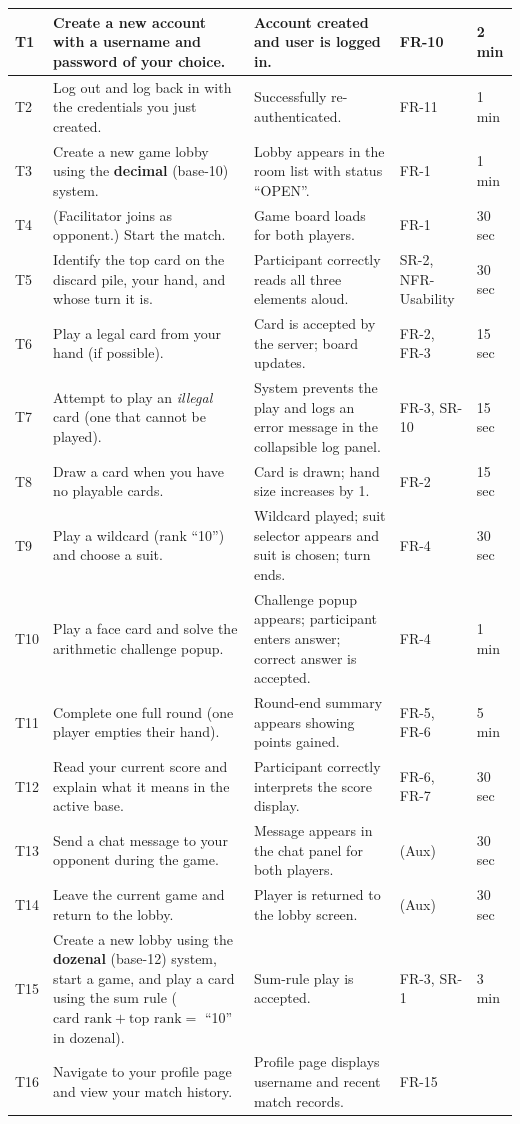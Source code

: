 \documentclass[12pt, titlepage]{article}
\begin{document}
\begin{longtable}{p{0.5cm} p{4.5cm} p{4cm} p{2.5cm} p{2.5cm}}
T1 & Create a new account with a username and password of your choice. & Account created and user is logged in. & FR-10 & 2 min \\
\midrule
T2 & Log out and log back in with the credentials you just created. & Successfully re-authenticated. & FR-11 & 1 min \\
\midrule
T3 & Create a new game lobby using the \textbf{decimal} (base-10) system. & Lobby appears in the room list with status ``OPEN''. & FR-1 & 1 min \\
\midrule
T4 & (Facilitator joins as opponent.) Start the match. & Game board loads for both players. & FR-1 & 30 sec \\
\midrule
T5 & Identify the top card on the discard pile, your hand, and whose turn it is. & Participant correctly reads all three elements aloud. & SR-2, NFR-Usability & 30 sec \\
\midrule
T6 & Play a legal card from your hand (if possible). & Card is accepted by the server; board updates. & FR-2, FR-3 & 15 sec \\
\midrule
T7 & Attempt to play an \emph{illegal} card (one that cannot be played). & System prevents the play and logs an error message in the collapsible log panel. & FR-3, SR-10 & 15 sec \\
\midrule
T8 & Draw a card when you have no playable cards. & Card is drawn; hand size increases by 1. & FR-2 & 15 sec \\
\midrule
T9 & Play a wildcard (rank ``10'') and choose a suit. & Wildcard played; suit selector appears and suit is chosen; turn ends. & FR-4 & 30 sec \\
\midrule
T10 & Play a face card and solve the arithmetic challenge popup. & Challenge popup appears; participant enters answer; correct answer is accepted. & FR-4 & 1 min \\
\midrule
T11 & Complete one full round (one player empties their hand). & Round-end summary appears showing points gained. & FR-5, FR-6 & 5 min \\
\midrule
T12 & Read your current score and explain what it means in the active base. & Participant correctly interprets the score display. & FR-6, FR-7 & 30 sec \\
\midrule
T13 & Send a chat message to your opponent during the game. & Message appears in the chat panel for both players. & (Aux) & 30 sec \\
\midrule
T14 & Leave the current game and return to the lobby. & Player is returned to the lobby screen. & (Aux) & 30 sec \\
\midrule
T15 & Create a new lobby using the \textbf{dozenal} (base-12) system, start a game, and play a card using the sum rule ($\text{card rank} + \text{top rank} = $ ``10'' in dozenal). & Sum-rule play is accepted. & FR-3, SR-1 & 3 min \\
\midrule
T16 & Navigate to your profile page and view your match history. & Profile page displays username and recent match records. & FR-15 \\

\end{longtable}
\end{document}
